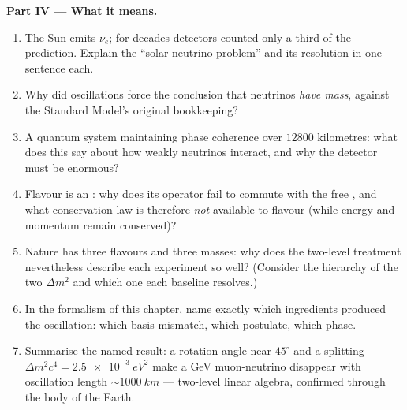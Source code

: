 \begin{problem}
\medskip\noindent\textbf{Part IV --- What it means.}
\begin{enumerate}[resume]
  \item The Sun emits $\nu_e$; for decades detectors counted only a
        third of the prediction. Explain the ``solar neutrino
        problem'' and its resolution in one sentence each.
  \item Why did oscillations force the conclusion that neutrinos
        \emph{have mass}, against the Standard Model's original
        bookkeeping?
  \item A quantum system maintaining phase coherence over
        $12800$ kilometres: what does this say about how weakly
        neutrinos interact, and why the detector must be enormous?
  \item Flavour is an : why does its operator fail to
        commute with the free , and what conservation
        law is therefore \emph{not} available to flavour (while
        energy and momentum remain conserved)?
  \item Nature has three flavours and three masses: why does the
        two-level treatment nevertheless describe each experiment
        so well? (Consider the hierarchy of the two $\Delta m^2$
        and which one each baseline resolves.)
  \item In the formalism of this chapter, name exactly which
        ingredients produced the oscillation: which basis mismatch,
        which postulate, which phase.
  \item Summarise the named result: a rotation angle near
        $45^\circ$ and a splitting $\Delta m^2c^4 =
        \qty{2.5e-3}{eV^2}$ make a GeV muon-neutrino disappear with
        oscillation length $\sim\qty{1000}{km}$ --- two-level linear
        algebra, confirmed through the body of the Earth.
\end{enumerate}
\end{problem}
